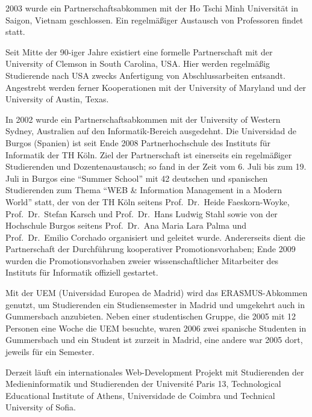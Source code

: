 2003 wurde ein Partnerschaftsabkommen mit der Ho Tschi Minh Universität
in Saigon, Vietnam geschlossen. Ein regelmäßiger Austausch von
Professoren findet statt.

Seit Mitte der 90-iger Jahre existiert eine formelle Partnerschaft mit
der University of Clemson in South Carolina, USA. Hier werden regelmäßig
Studierende nach USA zwecks Anfertigung von Abschlussarbeiten entsandt.
Angestrebt werden ferner Kooperationen mit der University of Maryland
und der University of Austin, Texas.

In 2002 wurde ein Partnerschaftsabkommen mit der University of Western
Sydney, Australien auf den Informatik-Bereich ausgedehnt. Die
Universidad de Burgos (Spanien) ist seit Ende 2008 Partnerhochschule des
Instituts für Informatik der TH Köln. Ziel der Partnerschaft ist
einerseits ein regelmäßiger Studierenden und Dozentenaustausch; so fand
in der Zeit vom 6. Juli bis zum 19. Juli in Burgos eine ``Summer
School'' mit 42 deutschen und spanischen Studierenden zum Thema ``WEB \&
Information Management in a Modern World'' statt, der von der TH Köln
seitens Prof.~Dr.~Heide Faeskorn-Woyke, Prof.~Dr.~Stefan Karsch und
Prof.~Dr.~Hans Ludwig Stahl sowie von der Hochschule Burgos seitens
Prof.~Dr.~Ana Maria Lara Palma und Prof.~Dr.~Emilio Corchado organisiert
und geleitet wurde. Andererseits dient die Partnerschaft der
Durchführung kooperativer Promotionsvorhaben; Ende 2009 wurden die
Promotionsvorhaben zweier wissenschaftlicher Mitarbeiter des Instituts
für Informatik offiziell gestartet.

Mit der UEM (Universidad Europea de Madrid) wird das ERASMUS-Abkommen
genutzt, um Studierenden ein Studiensemester in Madrid und umgekehrt
auch in Gummersbach anzubieten. Neben einer studentischen Gruppe, die
2005 mit 12 Personen eine Woche die UEM besuchte, waren 2006 zwei
spanische Studenten in Gummersbach und ein Student ist zurzeit in
Madrid, eine andere war 2005 dort, jeweils für ein Semester.

Derzeit läuft ein internationales Web-Development Projekt mit
Studierenden der Medieninformatik und Studierenden der Université Paris
13, Technological Educational Institute of Athens, Universidade de
Coimbra und Technical University of Sofia.

